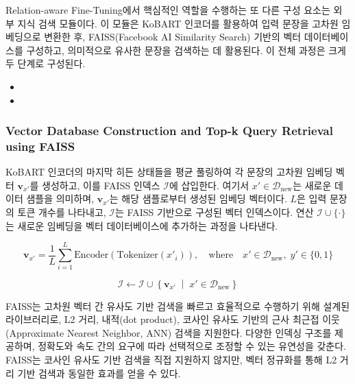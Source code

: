 \documentclass[a4paper,fleqn]{cas-sc}
\begin{document}
Relation-aware Fine-Tuning에서 핵심적인 역할을 수행하는 또 다른 구성 요소는 외부 지식 검색 모듈이다. 
이 모듈은 KoBART 인코더를 활용하여 입력 문장을 고차원 임베딩으로 변환한 후, FAISS(Facebook AI Similarity Search) 기반의 벡터 데이터베이스를 구성하고, 의미적으로 유사한 문장을 검색하는 데 활용된다. 
이 전체 과정은 크게 두 단계로 구성된다.
\begin{itemize}
    \item{}
    \item{}
\end{itemize}  

\subsubsection{Vector Database Construction and Top-k Query Retrieval using FAISS}


KoBART 인코더의 마지막 히든 상태들을 평균 풀링하여 각 문장의 고차원 임베딩 벡터 \( \mathbf{v}_{x'} \)를 생성하고, 이를 FAISS 인덱스 \( \mathcal{I} \)에 삽입한다. 
여기서 \( x' \in \mathcal{D}_{\text{new}} \)는 새로운 데이터 샘플을 의미하며, \( \mathbf{v}_{x'} \)는 해당 샘플로부터 생성된 임베딩 벡터이다. 
\( L \)은 입력 문장의 토큰 개수를 나타내고, \( \mathcal{I} \)는 FAISS 기반으로 구성된 벡터 인덱스이다. 
연산 \( \mathcal{I} \cup \{ \cdot \} \)는 새로운 임베딩을 벡터 데이터베이스에 추가하는 과정을 나타낸다. 

\begin{equation}
    \mathbf{v}_{x'} = \frac{1}{L} \sum_{i=1}^{L} \mathrm{Encoder}(\mathrm{Tokenizer}(x'_i)), \quad \text{where} \quad x' \in \mathcal{D}_{\text{new}}, \; y' \in \{0, 1\}
\end{equation}

\begin{equation}
    \mathcal{I} \leftarrow \mathcal{I} \cup \left\{ \mathbf{v}_{x'} \;\middle|\; x' \in \mathcal{D}_{\text{new}} \right\}
\end{equation}


FAISS는 고차원 벡터 간 유사도 기반 검색을 빠르고 효율적으로 수행하기 위해 설계된 라이브러리로, L2 거리, 내적(dot product), 코사인 유사도 기반의 근사 최근접 이웃(Approximate Nearest Neighbor, ANN) 검색을 지원한다. 
다양한 인덱싱 구조를 제공하며, 정확도와 속도 간의 요구에 따라 선택적으로 조정할 수 있는 유연성을 갖춘다.
FAISS는 코사인 유사도 기반 검색을 직접 지원하지 않지만, 벡터 정규화를 통해 L2 거리 기반 검색과 동일한 효과를 얻을 수 있다. 
\end{document}
